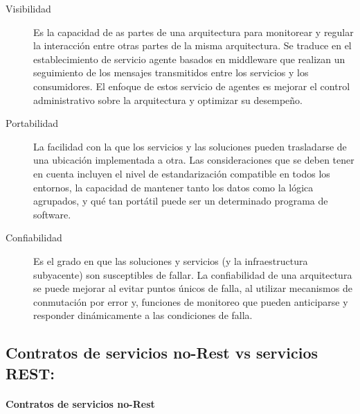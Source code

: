 \begin{description}
		\item[Visibilidad]  Es la capacidad de as partes de una arquitectura para monitorear y regular la interacción entre otras partes de la misma arquitectura. 
		Se traduce en el establecimiento de servicio agente basados en middleware que realizan un seguimiento de los mensajes transmitidos entre los servicios y los consumidores.
		El enfoque de estos servicio de agentes  es mejorar el control administrativo sobre la arquitectura y optimizar su desempeño. 			
 
		
		\item[Portabilidad]    La facilidad con la que los servicios y las soluciones pueden trasladarse de una ubicación implementada a otra.
		 Las consideraciones que se deben tener en cuenta incluyen el nivel de estandarización compatible en todos los entornos, la capacidad de mantener tanto los datos como la lógica agrupados, y qué tan portátil puede ser un determinado programa de software.	  			
 
		
		\item[Confiabilidad]    Es el grado en que las soluciones y servicios (y la infraestructura subyacente) son susceptibles de fallar.  La confiabilidad de una arquitectura se puede mejorar al evitar puntos únicos de falla, al utilizar mecanismos de conmutación por error y,  funciones de monitoreo que pueden anticiparse y responder dinámicamente a las condiciones de falla.  			
 		
	\end{description}	       
   
      \subsection{Contratos de servicios no-Rest vs servicios REST:}
             
       \paragraph{Contratos de servicios no-Rest}
       
